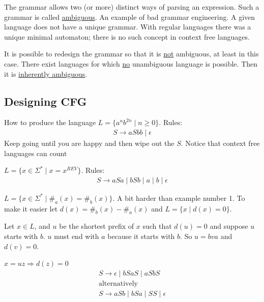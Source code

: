 \documentclass[../598comp.tex]{subfiles}
\begin{document}
\begin{definition}
  The grammar allows two (or more) distinct ways of parsing an expression. Such
  a grammar is called \ul{ambiguous}. An example of bad grammar engineering. A given
  language does not have a unique grammar. With regular languages there was a
  unique minimal automaton; there is no such concept in context free languages.

  It is possible to redesign the grammar so that it is \ul{not} ambiguous, at
  least in this case. There exist languages for which \ul{no} unambiguous
  language is possible. Then it is \ul{inherently ambiguous}.
\end{definition}

\subsection{Designing CFG}

\begin{example}
  How to produce the language $L = \{a^nb^{2n} \mid n \geq 0\}$. Rules:
  \begin{gather*}
    S \to aSbb \mid \epsilon
  \end{gather*}
  Keep going until you are happy and then wipe out the $S$.
  Notice that context free languages can count
\end{example}
\begin{example}[Palindromes]
  $L = \{x \in \Sigma^* \mid x = x^{REV}\}$. Rules:
  \begin{gather*}
    S \to aSa \mid bSb \mid a \mid b \mid \epsilon
  \end{gather*}
\end{example}
\begin{example}
  $L = \{x \in \Sigma^* \mid \#_a(x) = \#_b(x)\}$. A bit harder than example
  number 1. To make it easier let $d(x) = \#_b(x) - \#_a(x)$ and $L = \{x
  \mid d(x) = 0\}$.
  
  Let $x \in L$, and $u$ be the shortest prefix of $x$ such that $d(u) = 0$ and
  suppose $u$ starts with $b$. $u$ must end with $a$ because it starts with $b$.
  So $u = bva$ and $d(v) = 0$.
  
  $x = uz \Rightarrow d(z) = 0$
  \begin{gather*}
    S \to \epsilon \mid b SaS \mid aSbS \\
    \text{alternatively} \\
    S \to aSb \mid bSa \mid SS \mid \epsilon
  \end{gather*}
\end{example}
\end{document}
